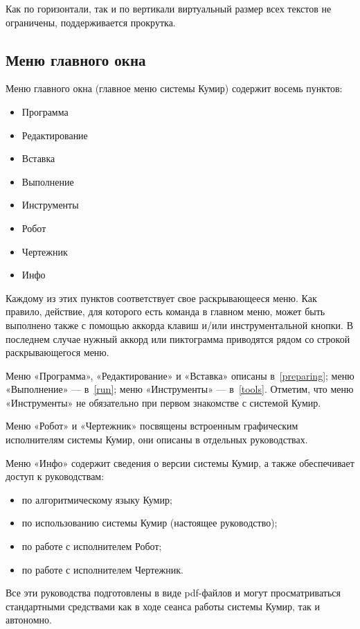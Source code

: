 Как по горизонтали, так и по вертикали виртуальный размер всех текстов не ограничены, поддерживается прокрутка.

\subsection{Меню главного окна}

Меню главного окна (главное меню системы Кумир) содержит восемь пунктов:
\begin{itemize}
\item	Программа
\item	Редактирование
\item	Вставка
\item	Выполнение
\item	Инструменты
\item	Робот
\item	Чертежник
\item	Инфо
\end{itemize}

Каждому из этих пунктов соответствует свое раскрывающееся меню. Как правило, действие, для которого есть команда в главном меню,  может быть выполнено также с помощью аккорда клавиш и/или инструментальной кнопки. В последнем случае нужный аккорд или пиктограмма приводятся рядом со строкой раскрывающегося меню. 

Меню «Программа», «Редактирование» и «Вставка» описаны в~\ref{preparing}; меню «Выполнение» --- в~\ref{run}; меню «Инструменты» --- в~\ref{tools}. Отметим, что меню «Инструменты» не обязательно при первом знакомстве с системой Кумир.

Меню «Робот» и «Чертежник» посвящены встроенным графическим исполнителям системы Кумир, они описаны в отдельных руководствах.

Меню «Инфо» содержит сведения о версии системы Кумир, а также обеспечивает доступ к руководствам:
\begin{itemize}
\item по алгоритмическому языку Кумир;
\item по использованию системы Кумир (настоящее руководство);
\item по работе с исполнителем Робот;
\item по работе с исполнителем Чертежник.
\end{itemize}

Все эти руководства подготовлены в виде pdf-файлов и могут просматриваться стандартными средствами как в ходе сеанса работы системы Кумир, так и автономно.

